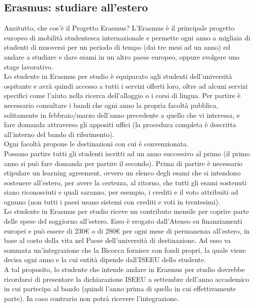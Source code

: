 \subsection{Erasmus: studiare all'estero}
Anzitutto, che cos'è il Progetto Erasmus? L'Erasmus è il principale progetto europeo di mobilità studentesca internazionale e permette ogni anno a migliaia di studenti di muoversi per un periodo di tempo (dai tre mesi ad un anno) ed andare a studiare e dare esami in un altro paese europeo, oppure svolgere uno stage lavorativo.\\
Lo studente in Erasmus per studio è equiparato agli studenti dell'università ospitante e avrà quindi accesso a tutti i servizi offerti loro, oltre ad alcuni servizi specifici come l'aiuto nella ricerca dell'alloggio o i corsi di lingua. Per partire è necessario consultare i bandi che ogni anno la propria facoltà pubblica, solitamente in febbraio/marzo dell'anno precedente a quello che vi interessa, e fare domanda attraverso gli appositi uffici (la procedura completa è descritta all'interno del bando di riferimento). \\
Ogni facoltà propone le destinazioni con cui è convenzionata.\\
Possono partire tutti gli studenti iscritti ad un anno successivo al primo (il primo anno si può fare domanda per partire il secondo). Prima di partire è necessario stipulare un learning agreement, ovvero un elenco degli esami che si intendono sostenere all'estero, per avere la certezza, al ritorno, che tutti gli esami sostenuti siano riconosciuti e quali saranno, per esempio, i crediti e il voto attribuiti ad ognuno (non tutti i paesi usano sistemi con crediti e voti in trentesimi).\\
Lo studente in Erasmus per studio riceve un contributo mensile per coprire parte delle spese del soggiorno all'estero. Esso è erogato dall'Ateneo su finanziamenti europei e può essere di 230€ o di 280€ per ogni mese di permanenza all'estero, in base al costo della vita nel Paese dell'università di destinazione. Ad esso va sommata un'integrazione che la Bicocca fornisce con fondi propri, la quale viene decisa ogni anno e la cui entità dipende dall'ISEEU dello studente.\\
A tal proposito, lo studente che intende andare in Erasmus per studio dovrebbe ricordarsi di presentare la dichiarazione ISEEU a settembre dell'anno accademico in cui partecipa al bando (quindi l'anno prima di quello in cui effettivamente parte). In caso contrario non potrà ricevere l'integrazione.\\
